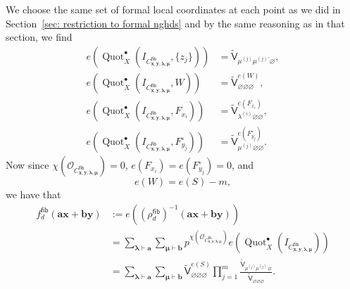 \documentclass[12pt]{amsart}
\theoremstyle{definition}
\renewcommand{\O}{\mathcal{O}}
\newcommand{\sfVtilde}{\widetilde{\mathsf{V}}}
\newcommand{\Quot}{\operatorname{Quot}}
\newcommand{\boldx}{\boldsymbol{x}}
\newcommand{\boldy}{\boldsymbol{y}}
\newcommand{\bolda}{\boldsymbol{a}}
\newcommand{\boldb}{\boldsymbol{b}}
\newcommand{\boldlambda}{\boldsymbol{\lambda }}
\newcommand{\boldmu}{\boldsymbol{\mu }}
\renewcommand{\emptyset}{\varnothing}
\newcommand{\fiber}{\mathsf{fib}}
\newcommand{\mujprime}{\mu^{(j)\prime}}
\begin{document}
We choose the same set of formal local coordinates at each point as we
did in Section~\ref{sec: restriction to formal nghds} and by the same
reasoning as in that section, we find
\begin{align*}
e\left(\Quot_X^{\bullet}(I_{C_{\boldx ,\boldy ,\boldlambda ,\boldmu}^{\fiber}},\{z_{j}\}) \right)&= \sfVtilde_{ \mu^{(j)} \mujprime  \emptyset },\\
e\left(\Quot_X^{\bullet}(I_{C_{\boldx ,\boldy ,\boldlambda ,\boldmu}^{\fiber}},W) \right) & = \sfVtilde^{e(W)}_{\emptyset \emptyset \emptyset },\\
e\left(\Quot_X^{\bullet}(I_{C_{\boldx ,\boldy ,\boldlambda ,\boldmu}^{\fiber}},F_{x_{i}}) \right)&= \sfVtilde^{e(F_{x_{i}})}_{\lambda^{(i)} \emptyset \emptyset },\\
e\left(\Quot_X^{\bullet}(I_{C_{\boldx ,\boldy ,\boldlambda ,\boldmu}^{\fiber}}, F^{\circ
}_{y_{j}} ) \right) & = \sfVtilde^{e(F^{\circ}_{y_{j}})}_{\mu^{(j)}
\emptyset \emptyset}.
\end{align*} 
Now since $\chi (\O_{C_{\boldx ,\boldy ,\boldlambda ,\boldmu}^{\fiber}})=0$, $e(F_{x_{i}})=e(F^{\circ}_{y_{j}})=0$,
and 
\[
e(W) = e(S) - m,
\]
we have that 
\begin{align*}
f^{\fiber}_{d}(\bolda \boldx +\boldb \boldy ) & :=
e\left(\left(\rho^{\fiber}_{d} \right)^{-1} (\bolda \boldx +\boldb \boldy ) \right)\\
&= \sum_{\boldlambda \vdash \bolda} \sum_{\boldmu \vdash \boldb} p^{\chi(\O_{C_{\boldx ,\boldy ,\boldlambda ,\boldmu}^{\fiber}})}
e\left( \Quot_X^\bullet(I_{C_{\boldx ,\boldy ,\boldlambda ,\boldmu}^{\fiber}})
\right) \\
&= \sum_{\boldlambda \vdash \bolda} \sum_{\boldmu \vdash \boldb}
\sfVtilde_{\emptyset \emptyset \emptyset}^{e(S)} \prod_{j=1}^{m}
\frac{\sfVtilde_{\mu^{(j)} \mujprime \emptyset }}{\sfVtilde_{\emptyset
\emptyset \emptyset}} .
\end{align*}
\end{document}
